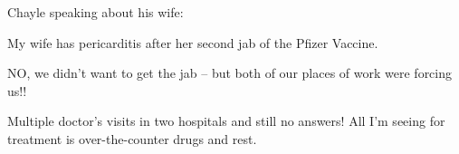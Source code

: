 Chayle speaking about his wife:

My wife has pericarditis after her second jab of the Pfizer Vaccine.

NO, we didn’t want to get the jab – but both of our places of work were forcing
us!!

Multiple doctor’s visits in two hospitals and still no answers! All I’m seeing
for treatment is over-the-counter drugs and rest.


